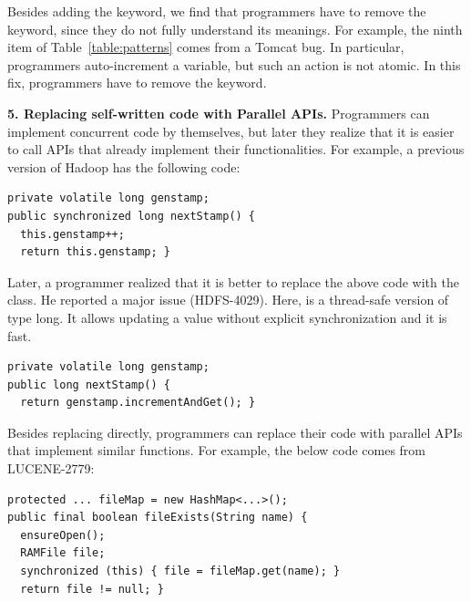 Besides adding the keyword, we find that programmers have to remove the  keyword, since they do not fully understand its meanings. For example, the ninth item of Table~\ref{table:patterns} comes from a Tomcat bug. In particular, programmers auto-increment a  variable, but such an action is not atomic. In this fix, programmers have to remove the keyword.

\noindent
\textbf{5. Replacing self-written code with Parallel APIs.} Programmers can implement concurrent code by themselves, but later they realize that it is easier to call APIs that already implement their functionalities. For example, a previous version of Hadoop has the following code:%


\begin{lstlisting}
private volatile long genstamp;
public synchronized long nextStamp() {
  this.genstamp++;
  return this.genstamp; }
\end{lstlisting}

Later, a programmer realized that it is better to replace the above code with the  class. He reported a major issue (HDFS-4029). Here,  is a thread-safe version of type long. It allows updating a  value without explicit synchronization and it is fast.



\begin{lstlisting}
private volatile long genstamp;
public long nextStamp() {
  return genstamp.incrementAndGet(); }
\end{lstlisting}

Besides replacing directly, programmers can replace their code with parallel APIs that implement similar functions. For example, the below code comes from LUCENE-2779:

\begin{lstlisting}
protected ... fileMap = new HashMap<...>();
public final boolean fileExists(String name) {
  ensureOpen();
  RAMFile file;
  synchronized (this) { file = fileMap.get(name); }
  return file != null; }
\end{lstlisting}

